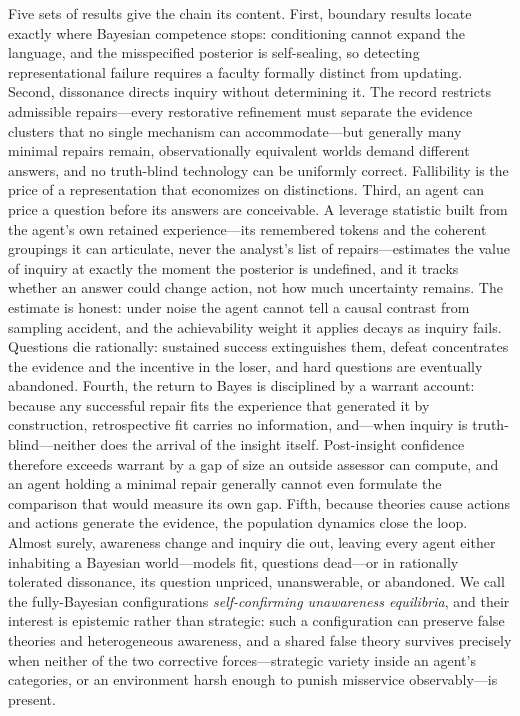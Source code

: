 \documentclass[11pt]{article}
\theoremstyle{definition}
\begin{document}
Five sets of results give the chain its content.  First, boundary results
locate exactly where Bayesian competence stops: conditioning cannot expand
the language, and the misspecified posterior is self-sealing, so detecting
representational failure requires a faculty formally distinct from
updating.  Second, dissonance directs inquiry without determining it.  The
record restricts admissible repairs---every restorative refinement must
separate the evidence clusters that no single mechanism can accommodate---but
generally many minimal repairs remain, observationally equivalent worlds
demand different answers, and no truth-blind technology can be uniformly
correct.  Fallibility is the price of a representation that economizes on
distinctions.  Third, an agent can price a question before its answers are
conceivable.  A leverage statistic built from the agent's own retained
experience---its remembered tokens and the coherent groupings it can
articulate, never the analyst's list of repairs---estimates the value of
inquiry at exactly the moment the posterior is undefined, and it tracks
whether an answer could change action, not how much uncertainty remains.  The
estimate is honest: under noise the agent cannot tell a causal contrast from
sampling accident, and the achievability weight it applies decays as inquiry
fails.  Questions die rationally: sustained success extinguishes them, defeat
concentrates the evidence and the incentive in the loser, and hard questions
are eventually abandoned.  Fourth, the return to Bayes is disciplined by a
warrant account: because any successful repair fits the experience that
generated it by construction, retrospective fit carries no information,
and---when inquiry is truth-blind---neither does the arrival of the insight
itself.  Post-insight confidence therefore exceeds warrant by a gap of size an
outside assessor can compute, and an agent holding a minimal repair generally
cannot even formulate the comparison that would measure its own gap.  Fifth,
because theories cause actions and actions generate the evidence, the
population dynamics close the loop.  Almost surely, awareness change and
inquiry die out, leaving every agent either inhabiting a Bayesian world---models
fit, questions dead---or in rationally tolerated dissonance, its question
unpriced, unanswerable, or abandoned.  We call the fully-Bayesian
configurations \emph{self-confirming unawareness equilibria}, and their
interest is epistemic rather than strategic: such a configuration can preserve
false theories and heterogeneous awareness, and a shared false theory survives
precisely when neither of the two corrective forces---strategic variety inside
an agent's categories, or an environment harsh enough to punish misservice
observably---is present.
\end{document}
